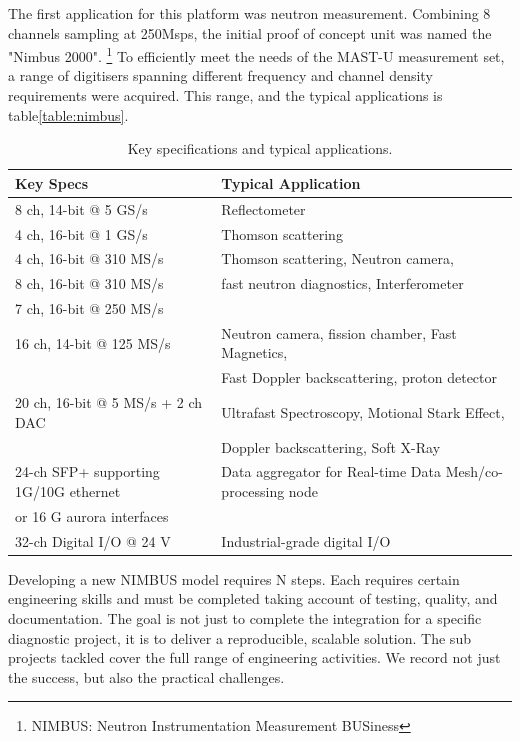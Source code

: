 \documentclass[preprint]{elsarticle}
\begin{document}
The first application for this platform was neutron measurement.  Combining
8 channels sampling at 250Msps, the initial proof of concept unit was named the "Nimbus 2000".
\footnote{NIMBUS: Neutron Instrumentation Measurement BUSiness}
To efficiently meet the needs of the MAST-U measurement set, a range of digitisers
spanning different frequency and channel density requirements were acquired.  
This range, and the typical applications is 
table\ref{table:nimbus}.

\begin{table}[htbp]
\centering
\caption{Key specifications and typical applications.}
\label{tab:key-specifications}
\begin{tabularx}{\textwidth}{@{} l X @{}}
\hline
\textbf{Key Specs} & \textbf{Typical Application} \\
\hline

8 ch, 14-bit @ 5 GS/s
& Reflectometer \\

4 ch, 16-bit @ 1 GS/s
& Thomson scattering \\

4 ch, 16-bit @ 310 MS/s
& Thomson scattering, Neutron camera, \\
8 ch, 16-bit @ 310 MS/s
& fast neutron diagnostics, Interferometer \\
7 ch, 16-bit @ 250 MS/s
& \\

16 ch, 14-bit @ 125 MS/s
& Neutron camera, fission chamber, Fast Magnetics, \\
& Fast Doppler backscattering, proton detector \\

20 ch, 16-bit @ 5 MS/s + 2 ch DAC
& Ultrafast Spectroscopy, Motional Stark Effect, \\
& Doppler backscattering, Soft X-Ray \\

24-ch SFP+ supporting 1G/10G ethernet
& Data aggregator for Real-time Data Mesh/co-processing node \\
or 16 G aurora interfaces
& \\

32-ch Digital I/O @ 24 V
& Industrial-grade digital I/O \\

\hline
\end{tabularx}
\end{table}

Developing a new NIMBUS model requires N steps.  Each requires certain engineering skills
and must be completed taking account of testing, quality, and documentation. 
The goal is not just to complete the integration for a specific diagnostic project,
it is to deliver a reproducible, scalable solution.  The sub projects tackled 
cover the full range of engineering activities.  We record not just the success, 
but also the practical challenges.
\end{document}
